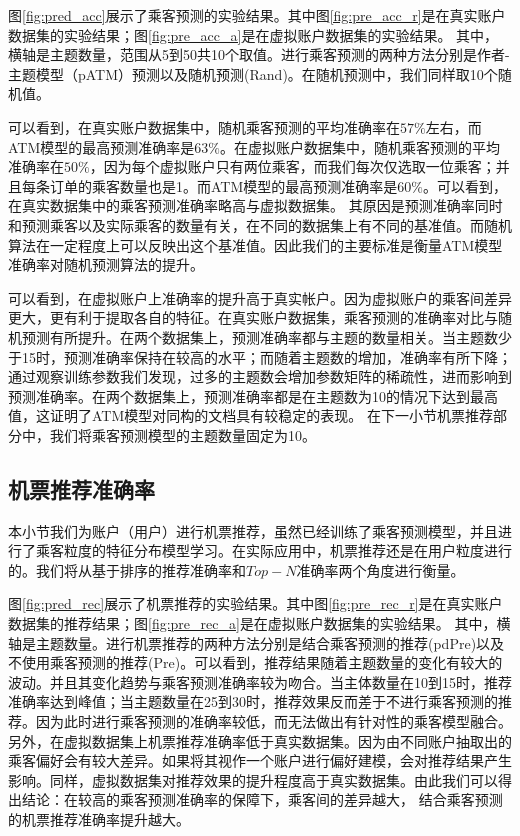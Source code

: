 图\ref{fig:pred_acc}展示了乘客预测的实验结果。其中图\ref{fig:pre_acc_r}是在真实账户数据集的实验结果；图\ref{fig:pre_acc_a}是在虚拟账户数据集的实验结果。
其中，横轴是主题数量，范围从5到50共10个取值。进行乘客预测的两种方法分别是作者-主题模型（pATM）预测以及随机预测(Rand)。在随机预测中，我们同样取10个随机值。

可以看到，在真实账户数据集中，随机乘客预测的平均准确率在$57\%$左右，而ATM模型的最高预测准确率是$63\%$。在虚拟账户数据集中，随机乘客预测的平均准确率在$50\%$，因为每个虚拟账户只有两位乘客，而我们每次仅选取一位乘客；并且每条订单的乘客数量也是1。而ATM模型的最高预测准确率是$60\%$。可以看到，在真实数据集中的乘客预测准确率略高与虚拟数据集。
其原因是预测准确率同时和预测乘客以及实际乘客的数量有关，在不同的数据集上有不同的基准值。而随机算法在一定程度上可以反映出这个基准值。因此我们的主要标准是衡量ATM模型准确率对随机预测算法的提升。

可以看到，在虚拟账户上准确率的提升高于真实帐户。因为虚拟账户的乘客间差异更大，更有利于提取各自的特征。在真实账户数据集，乘客预测的准确率对比与随机预测有所提升。在两个数据集上，预测准确率都与主题的数量相关。当主题数少于15时，预测准确率保持在较高的水平；而随着主题数的增加，准确率有所下降；通过观察训练参数我们发现，过多的主题数会增加参数矩阵的稀疏性，进而影响到预测准确率。在两个数据集上，预测准确率都是在主题数为10的情况下达到最高值，这证明了ATM模型对同构的文档具有较稳定的表现。
在下一小节机票推荐部分中，我们将乘客预测模型的主题数量固定为10。


\subsection{机票推荐准确率}
本小节我们为账户（用户）进行机票推荐，虽然已经训练了乘客预测模型，并且进行了乘客粒度的特征分布模型学习。在实际应用中，机票推荐还是在用户粒度进行的。我们将从基于排序的推荐准确率和$Top-N$准确率两个角度进行衡量。

\begin{figure}
\centering
{}
\end{figure}

图\ref{fig:pred_rec}展示了机票推荐的实验结果。其中图\ref{fig:pre_rec_r}是在真实账户数据集的推荐结果；图\ref{fig:pre_rec_a}是在虚拟账户数据集的实验结果。
其中，横轴是主题数量。进行机票推荐的两种方法分别是结合乘客预测的推荐(pdPre)以及不使用乘客预测的推荐(Pre)。可以看到，推荐结果随着主题数量的变化有较大的波动。并且其变化趋势与乘客预测准确率较为吻合。当主体数量在10到15时，推荐准确率达到峰值；当主题数量在25到30时，推荐效果反而差于不进行乘客预测的推荐。因为此时进行乘客预测的准确率较低，而无法做出有针对性的乘客模型融合。另外，在虚拟数据集上机票推荐准确率低于真实数据集。因为由不同账户抽取出的乘客偏好会有较大差异。如果将其视作一个账户进行偏好建模，会对推荐结果产生影响。同样，虚拟数据集对推荐效果的提升程度高于真实数据集。由此我们可以得出结论：在较高的乘客预测准确率的保障下，乘客间的差异越大，
结合乘客预测的机票推荐准确率提升越大。


